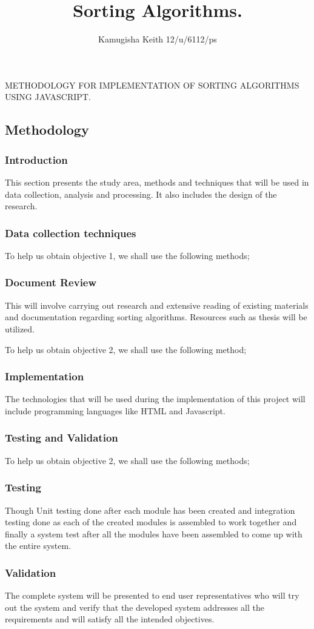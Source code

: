 \documentclass{article}
\title{Sorting Algorithms.}
\author{Kamugisha Keith 12/u/6112/ps}
\begin{document}
METHODOLOGY FOR IMPLEMENTATION OF SORTING ALGORITHMS USING JAVASCRIPT. 
	
\subsection{Methodology}

\subsubsection{Introduction}
	This section presents the study area, methods and techniques that will be used in data collection, analysis and processing. It also includes the design of the research. 	

\subsubsection{Data collection techniques}
	To help us obtain objective 1, we shall use the following methods;
	
\subsubsection{Document Review}
	This will involve carrying out research and extensive reading of existing materials and documentation regarding sorting algorithms. Resources such as thesis will be utilized.
	
	To help us obtain objective 2, we shall use the following method;
	
\subsubsection{Implementation}
	The technologies that will be used during the implementation of this project will include programming languages like HTML and Javascript.

\subsubsection{Testing and Validation}
	
	To help us obtain objective 2, we shall use the following methods;
\subsubsection{Testing}
	Though Unit testing done after each module has been created and integration testing done as each of the created modules is assembled to work together and finally a system test after all the modules have been assembled to come up with the entire system.   
	
\subsubsection{Validation}
	The complete system will be presented to end user representatives who will try out the system and verify that the developed system addresses all the requirements and will satisfy all the intended objectives.
	
\end{document}
